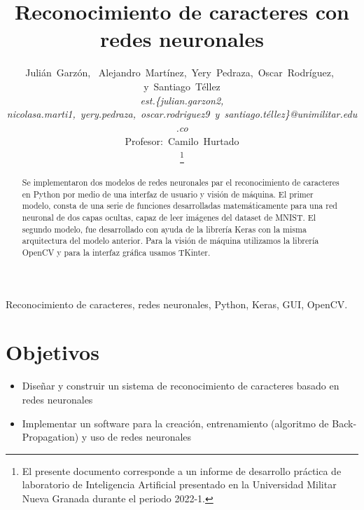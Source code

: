 \documentclass[journal]{IEEEtran}
\begin{document}
\title{Reconocimiento de caracteres con redes neuronales}

\author{Julián~Garzón,~
        Alejandro~Martínez,~Yery~Pedraza,~Oscar~Rodríguez,~
        y~Santiago~Téllez\\
				\textit{est.\{julian.garzon2, nicolasa.marti1,~yery.pedraza,~oscar.rodriguez9~y~santiago.téllez\}@unimilitar.edu.co}\\
				Profesor:~Camilo~Hurtado\\%
\thanks{El presente documento corresponde a un informe de desarrollo práctica de laboratorio de Inteligencia Artificial presentado en la Universidad Militar Nueva Granada durante el periodo 2022-1.}} 


\maketitle

\begin{abstract}
Se implementaron dos modelos de redes neuronales par el reconocimiento de caracteres en Python por medio de una interfaz de usuario y visión de máquina. El primer modelo, consta de una serie de funciones desarrolladas matemáticamente para una red neuronal de dos capas ocultas, capaz de leer imágenes del dataset de MNIST. El segundo modelo, fue desarrollado con ayuda de la librería Keras con la misma arquitectura del modelo anterior. Para la visión de máquina utilizamos la librería OpenCV y para la interfaz gráfica usamos TKinter. 
\end{abstract}

\begin{IEEEkeywords}
Reconocimiento de caracteres, redes neuronales, Python, Keras, GUI, OpenCV.
\end{IEEEkeywords}


\section{Objetivos}
\begin{itemize}
\item Diseñar  y  construir  un  sistema  de  reconocimiento  de  caracteres  basado  en  redes neuronales
\item Implementar   un   software para   la   creación,   entrenamiento   (algoritmo   de   Back-Propagation) y uso de redes neuronales
\end{itemize}
\end{document}
